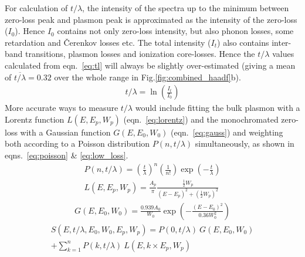 \documentclass[%
aip,
rsi,%
 amsmath,amssymb,%
 reprint,%
]{revtex4-1}
\begin{document}
For calculation of $t/\lambda$, the intensity of the spectra up to the minimum between zero-loss peak and plasmon peak is approximated as the intensity of the zero-loss ($I_0$). Hence $I_0$ contains not only zero-loss intensity, but also phonon losses, some retardation and \v{C}erenkov losses etc. The total intensity ($I_t$) also contains inter-band transitions, plasmon losses and ionization core-losses. Hence the $t/\lambda$ values calculated from eqn.~\ref{eq:tl} will always be slightly over-estimated (giving a mean of $\overline{t/\lambda}=0.32$ over the whole range in Fig.\ref{fig:combined_haadf}b).
\begin{eqnarray}
	t/\lambda = \operatorname{ln}\left(\frac{I_t}{I_0}\right)
    \label{eq:tl}
\end{eqnarray}
More accurate ways to measure $t/\lambda$ would include fitting the bulk plasmon with a Lorentz function $L(E,E_p,W_p)$ (eqn.~\ref{eq:lorentz}) and the monochromated zero-loss with a Gaussian function $G(E,E_0,W_0)$ (eqn.~\ref{eq:gauss}) and weighting both according to a Poisson distribution $P(n,t/\lambda)$ simultaneously, as shown in eqns.~\ref{eq:poisson} \& \ref{eq:low_loss}.
\begin{eqnarray}
	P(n,t/\lambda) = \left(\frac{t}{\lambda}\right)^n\left(\frac{1}{n!}\right)\operatorname{exp}\left(-\frac{t}{\lambda}\right)
    \label{eq:poisson}\\
	L(E,E_p,W_p) = \frac{A_p}{\pi} \frac{\frac{1}{2}W_p}{(E-E_p)^2+\left(\frac{1}{2}W_p\right)^2}
    \label{eq:lorentz}
\end{eqnarray}
\begin{align}
	G(E,E_0,W_0) = \frac{0.939A_0}{W_0}\operatorname{exp}\left(-\frac{(E-E_0)^2}{0.36W_0^2}\right)
    \label{eq:gauss}
\end{align}
\begin{align}
	S(E,t/\lambda,E_0,W_0,E_p,W_p) = P(0,t/\lambda)~G(E,E_0,W_0) \nonumber \\
     +\sum_{k=1}^{n}P(k,t/\lambda)~L(E,k\times E_p,W_p)    \label{eq:low_loss}
\end{align}
\end{document}
